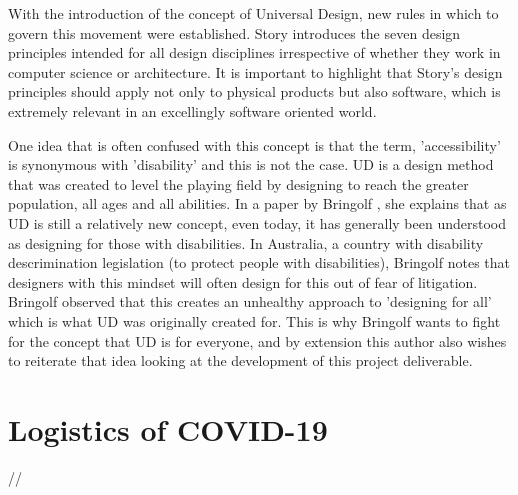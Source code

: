 With the introduction of the concept of Universal Design, new rules in which to govern this movement were established.
Story introduces the seven design principles \cite{sevenprinciples} intended for all design disciplines irrespective of whether they work in computer science or architecture.
It is important to highlight that Story's design principles should apply not only to physical products but also software, which is extremely relevant in an excellingly software oriented world.

One idea that is often confused with this concept is that the term, 'accessibility' is synonymous with 'disability' and this is not the case.
UD is a design method that was created to level the playing field by designing to reach the greater population, all ages and all abilities.
In a paper by Bringolf \cite{accessible}, she explains that as UD is still a relatively new concept, even today, it has generally been understood as designing for those with disabilities.
In Australia, a country with disability descrimination legislation (to protect people with disabilities), Bringolf notes that designers with this mindset will often design for this out of fear of litigation.
Bringolf observed that this creates an unhealthy approach to 'designing for all' which is what UD was originally created for. %
This is why Bringolf wants to fight for the concept that UD is for everyone, and by extension this author also wishes to reiterate that idea looking at the development of this project deliverable. %


\section{Logistics of COVID-19}
//


